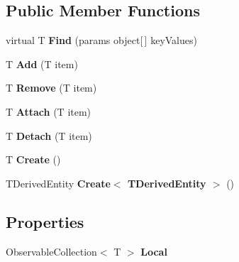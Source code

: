 \subsection*{Public Member Functions}
\begin{DoxyCompactItemize}
\item 
\mbox{\label{class_car_shop_1_1_logic_1_1_tests_1_1_fake_db_set_a09cca1064c6bcc2ca3a16999968c2e8e}} 
virtual T {\bfseries Find} (params object\mbox{[}$\,$\mbox{]} key\+Values)
\item 
\mbox{\label{class_car_shop_1_1_logic_1_1_tests_1_1_fake_db_set_af365424955588926e353b14c3b48cd2e}} 
T {\bfseries Add} (T item)
\item 
\mbox{\label{class_car_shop_1_1_logic_1_1_tests_1_1_fake_db_set_a40c1bd39f989801d4d2d171226d95a30}} 
T {\bfseries Remove} (T item)
\item 
\mbox{\label{class_car_shop_1_1_logic_1_1_tests_1_1_fake_db_set_a3f0149159360cd416c209c7f9dd3d732}} 
T {\bfseries Attach} (T item)
\item 
\mbox{\label{class_car_shop_1_1_logic_1_1_tests_1_1_fake_db_set_ad469e900f1f91da395dcb2e493fc9fd3}} 
T {\bfseries Detach} (T item)
\item 
\mbox{\label{class_car_shop_1_1_logic_1_1_tests_1_1_fake_db_set_a85e79d18843d0648f3cf71d55d9919c1}} 
T {\bfseries Create} ()
\item 
\mbox{\label{class_car_shop_1_1_logic_1_1_tests_1_1_fake_db_set_ad98d18852b1c20f330c5c4e9613b3b2a}} 
T\+Derived\+Entity {\bfseries Create$<$ T\+Derived\+Entity $>$} ()
\end{DoxyCompactItemize}
\subsection*{Properties}
\begin{DoxyCompactItemize}
\item 
\mbox{\label{class_car_shop_1_1_logic_1_1_tests_1_1_fake_db_set_a792d13a05c2f05784efbd571f3d6d5ca}} 
Observable\+Collection$<$ T $>$ {\bfseries Local}
\end{DoxyCompactItemize}


